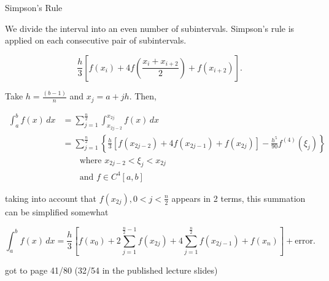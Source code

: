 \Ex Simpson's Rule

\begin{center}
\end{center}


We divide the interval into an even number of subintervals. Simpson's rule is
applied on each consecutive pair of subintervals.

\[
  \frac{h}{3} \left[f(x_i) + 4f(\frac{x_i+x_{i+2}}{2}) + f(x_{i+2})\right]
.\]

Take $\displaystyle h=\frac{(b-1)}{n}$ and $x_j = a + jh$. Then,

\begin{align*}
  \int_{a}^{b} f(x) \, dx &= \sum_{j=1}^{\frac{n}{2}} \int_{x_{2j-2}}^{x_{2j}}
  f(x) \, dx \\
                          &= \sum_{j=1}^{\frac{n}{2}} \left\{
                            \frac{h}{3} \left[
                              f(x_{2j-2}) + 4f(x_{2j-1}) + f(x_{2j})
                            \right] - \frac{h^5}{90} f^{(4)}(\xi_j)
                          \right\} \\
                          &\qquad\text{where } x_{2j-2} < \xi_j < x_{2j} \\
                          &\qquad\text{and } f \in C^4[a,b]
\end{align*}

taking into account that $f(x_{2j}), 0 < j < \frac{n}{2}$ appears in 2 terms,
this summation can be simplified somewhat

\[
  \int_{a}^{b} f(x) \, dx = \frac{h}{3} \left[
    f(x_0) + 2 \sum_{j=1}^{\frac{n}{2}-1} f(x_{2j}) + 4 \sum_{j=1}^{\frac{n}{2}}
    f(x_{2j-1}) + f(x_n)
  \right] + \text{error}
.\]


got to page 41/80 (32/54 in the published lecture slides)
